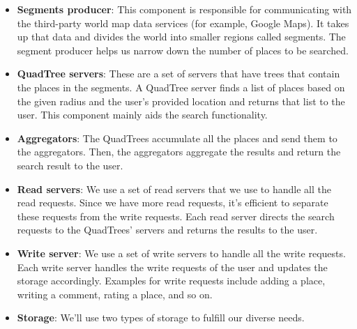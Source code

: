 \begin{itemize}
\item
\protect{}\label{snMvXjbUSB6ZBU-uaJk-Y}
\textbf{Segments producer}: This component is responsible for communicating with the third-party world map data services (for example, Google Maps). It takes up that data and divides the world into smaller regions called segments. The segment producer helps us narrow down the number of places to be searched.
\item
\protect{}\label{sTkX98yQd3t6N3KG9Oxqd}
\textbf{QuadTree servers}: These are a set of servers that have trees that contain the places in the segments. A QuadTree server finds a list of places based on the given radius and the user's provided location and returns that list to the user. This component mainly aids the search functionality.
\item
\protect{}\label{okpBfPHTQVpVjtZLMs5je}
\textbf{Aggregators}: The QuadTrees accumulate all the places and send them to the aggregators. Then, the aggregators aggregate the results and return the search result to the user.
\item
\protect{}\label{b7R7b6Pbdo26CS_S7yDwZ}
\textbf{Read servers}: We use a set of read servers that we use to handle all the read requests. Since we have more read requests, it's efficient to separate these requests from the write requests. Each read server directs the search requests to the QuadTrees' servers and returns the results to the user.
\item
\protect{}\label{-7QVDA0-4PJFmaWwNdZ8R}
\textbf{Write server}: We use a set of write servers to handle all the write requests. Each write server handles the write requests of the user and updates the storage accordingly. Examples for write requests include adding a place, writing a comment, rating a place, and so on.
\item
\protect{}\label{2MVItd7KK_v9TJOmj98mi}
\textbf{Storage}: We'll use two types of storage to fulfill our diverse needs.


\end{itemize}

